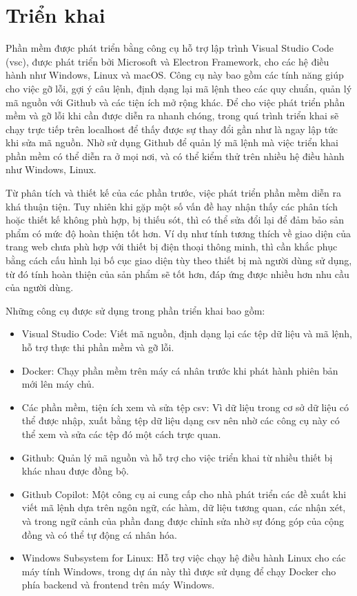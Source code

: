 \documentclass[./../main.tex]{subfiles}
\begin{document}
\section{Triển khai}
Phần mềm được phát triển bằng công cụ hỗ trợ lập trình Visual Studio Code (\acrshort{vsc}), được phát triển bởi Microsoft và Electron Framework, cho các hệ điều hành như Windows, Linux và macOS. Công cụ này bao gồm các tính năng giúp cho việc gỡ lỗi, gợi ý câu lệnh, định dạng lại mã lệnh theo các quy chuẩn, quản lý mã nguồn với Github và các tiện ích mở rộng khác. Để cho việc phát triển phần mềm và gỡ lỗi khi cần được diễn ra nhanh chóng, trong quá trình triển khai sẽ chạy trực tiếp trên localhost để thấy được sự thay đổi gần như là ngay lập tức khi sửa mã nguồn. Nhờ sử dụng Github để quản lý mã lệnh mà việc triển khai phần mềm có thể diễn ra ở mọi nơi, và có thể kiểm thử trên nhiều hệ điều hành như Windows, Linux.

Từ phân tích và thiết kế của các phần trước, việc phát triển phần mềm diễn ra khá thuận tiện. Tuy nhiên khi gặp một số vấn đề hay nhận thấy các phân tích hoặc thiết kế không phù hợp, bị thiếu sót, thì có thể sửa đổi lại để đảm bảo sản phẩm có mức độ hoàn thiện tốt hơn. Ví dụ như tính tương thích về giao diện của trang web chưa phù hợp với thiết bị điện thoại thông minh, thì cần khắc phục bằng cách cấu hình lại bố cục giao diện tùy theo thiết bị mà người dùng sử dụng, từ đó tính hoàn thiện của sản phẩm sẽ tốt hơn, đáp ứng được nhiều hơn nhu cầu của người dùng.

Những công cụ được sử dụng trong phần triển khai bao gồm:
\begin{itemize}
    \item Visual Studio Code: Viết mã nguồn, định dạng lại các tệp dữ liệu và mã lệnh, hỗ trợ thực thi phần mềm và gỡ lỗi.
    \item Docker: Chạy phần mềm trên máy cá nhân trước khi phát hành phiên bản mới lên máy chủ.
    \item Các phần mềm, tiện ích xem và sửa tệp csv: Vì dữ liệu trong cơ sở dữ liệu có thể được nhập, xuất bằng tệp dữ liệu dạng csv nên nhờ các công cụ này có thể xem và sửa các tệp đó một cách trực quan.
    \item Github: Quản lý mã nguồn và hỗ trợ cho việc triển khai từ nhiều thiết bị khác nhau được đồng bộ.
    \item Github Copilot: Một công cụ \acrshort{ai} cung cấp cho nhà phát triển các đề xuất khi viết mã lệnh dựa trên ngôn ngữ, các hàm, dữ liệu tương quan, các nhận xét, và trong ngữ cảnh của phần đang được chỉnh sửa nhờ sự đóng góp của cộng đồng và có thể tự động cá nhân hóa.
    \item Windows Subsystem for Linux: Hỗ trợ việc chạy hệ điều hành Linux cho các máy tính Windows, trong dự án này thì được sử dụng để chạy Docker cho phía backend và frontend trên máy Windows.
\end{itemize}
\end{document}
